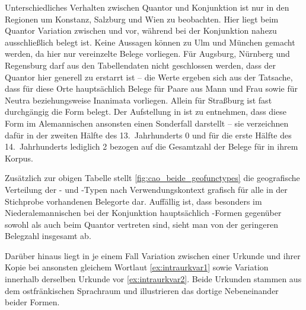 Unterschiedliches Verhalten zwischen Quantor und Konjunktion ist nur in den
Regionen um Konstanz, Salzburg und Wien zu beobachten. Hier liegt beim Quantor
Variation zwischen  und  vor, während bei der
Konjunktion nahezu ausschließlich  belegt ist. Keine Aussagen
können zu Ulm und München gemacht werden, da hier nur vereinzelte Belege
vorliegen. Für Augsburg, Nürnberg und Regensburg darf aus den Tabellendaten
nicht geschlossen werden, dass der Quantor hier generell zu 
erstarrt ist -- die Werte ergeben sich aus der Tatsache, dass für diese Orte
hauptsächlich Belege für Paare aus Mann und Frau sowie für Neutra
beziehungsweise Inanimata vorliegen. Allein für Straßburg ist fast durchgängig
die Form  belegt. Der Aufstellung in \citet[621, Abb.~P~177]{ksw2}
ist zu entnehmen, dass diese Form im Alemannischen ansonsten einen Sonderfall
darstellt -- sie verzeichnen dafür in der zweiten Hälfte des 13.~Jahrhunderts
0\pct{} und für die erste Hälfte des 14.~Jahrhunderts lediglich 2\pct{} bezogen
auf die Gesamtzahl der Belege für  in ihrem Korpus.

Zusätzlich zur obigen Tabelle stellt \cref{fig:cao_beide_geofunctypes} die
geografische Verteilung der - und -Typen nach
Verwendungskontext grafisch für alle in der Stichprobe vorhandenen Belegorte
dar. Auffällig ist, dass besonders im Nieder\-alemannischen bei der Konjunktion
hauptsächlich -Formen gegenüber sowohl  als auch
 beim Quantor vertreten sind, sieht man von der geringeren
Belegzahl insgesamt ab.


Darüber hinaus liegt in je einem Fall Variation zwischen einer Urkunde und
ihrer Kopie bei ansonsten gleichem Wortlaut \cref{ex:intraurkvar1} sowie
Variation innerhalb derselben Urkunde vor \cref{ex:intraurkvar2}. Beide
Urkunden stammen aus dem ostfränkischen Sprachraum und illustrieren das dortige
Neben\-einander beider Formen.

